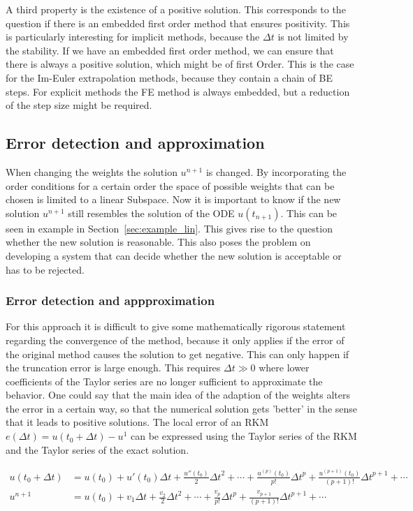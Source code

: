 \documentclass[a4paper]{article}
\numberwithin{equation}{section}
\theoremstyle{plain}
\theoremstyle{definition}
\numberwithin{theorem}{section}
\newcommand{\dt}{{\Delta t}}
\newcommand{\1}{\mathbbm{1}}
\begin{document}
A third property is the existence of a positive solution. This corresponds to the question if there is an embedded first order method that ensures positivity. This is particularly interesting for implicit methods, because the $\dt$ is not limited by the stability.  
If we have an embedded first order method, we can ensure that there is always a positive solution, which might be of first Order.  
This is the case for the Im-Euler extrapolation methods, because they contain a chain of BE steps. 
For explicit methods the FE method is always embedded, but a reduction of the step size might be required. 

\subsection{Error detection and approximation}
When changing the weights the solution $u^{n+1}$ is changed. 
By incorporating the order conditions for a certain order the space of possible weights that can be chosen is limited to a linear Subspace. 
Now it is important to know if the new solution $u^{n+1}$ still resembles the solution of the ODE $u(t_{n+1})$. 
This can be seen in example in Section~\ref{sec:example_lin}.
This gives rise to the question whether the new solution is reasonable.
This also poses the problem on developing a system that can decide whether the new solution is acceptable or has to be rejected.
 
\subsubsection{Error detection and appproximation}
For this approach it is difficult to give some mathematically rigorous statement regarding the convergence of the method, because it only applies if the error of the original method causes the solution to get negative. This can only happen if the truncation error is large enough. This requires $\dt \gg 0$ where lower coefficients of the Taylor series are no longer sufficient to approximate the behavior. 
One could say that the main idea of the adaption of the weights alters the error in a certain way, so that the numerical solution gets 'better' in the sense that it leads to positive solutions. 
The local error of an RKM $e(\dt) =u(t_0 + \dt) - u^1$ can be expressed using the Taylor series of the RKM and the Taylor series of the exact solution. %

\begin{align}\label{eq:Taylor_sol_ref}
u(t_0 + \dt) &= u(t_0) + u'(t_0) \dt + \frac{u''(t_0)}{2} \dt^2 + \cdots + \frac{u^{(p)}(t_0)}{p!} \dt^p + \frac{u^{(p+1)}(t_0)}{(p+1)!} \dt^{p+1} + \cdots \\
u^{n+1} &= u(t_0)  + v_1 \dt + \frac{v_2}{2} \dt^2 + \cdots + \frac{v_p}{p!} \dt^p + \frac{v_{p+1}}{(p+1)!} \dt^{p+1} + \cdots 
\end{align}
\end{document}

